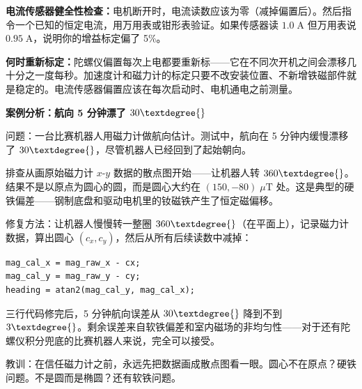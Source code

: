 \textbf{电流传感器健全性检查：}电机断开时，电流读数应该为零（减掉偏置后）。然后指令一个已知的恒定电流，用万用表或钳形表验证。如果传感器读 $1.0\;\mathrm{A}$ 但万用表说 $0.95\;\mathrm{A}$，说明你的增益标定偏了 5\%。

\textbf{何时重新标定：}陀螺仪偏置每次上电都要重新标——它在不同次开机之间会漂移几十分之一度每秒。加速度计和磁力计的标定只要不改安装位置、不新增铁磁部件就是稳定的。电流传感器偏置应该在每次启动时、电机通电之前测量。


\vspace{0.5em}
\begin{mdframed}[linewidth=1pt, innertopmargin=10pt, innerbottommargin=10pt]
\textbf{案例分析：航向 5 分钟漂了 $30\textdegree{}$}

\vspace{0.3em}
问题：一台比赛机器人用磁力计做航向估计。测试中，航向在 5 分钟内缓慢漂移了 $30\textdegree{}$，尽管机器人已经回到了起始朝向。

排查从画原始磁力计 $x$-$y$ 数据的散点图开始——让机器人转 $360\textdegree{}$。结果不是以原点为圆心的圆，而是圆心大约在 $(150, -80)\;\mu\mathrm{T}$ 处。这是典型的硬铁偏差——钢制底盘和驱动电机里的钕磁铁产生了恒定磁偏移。

修复方法：让机器人慢慢转一整圈 $360\textdegree{}$（在平面上），记录磁力计数据，算出圆心 $(c_x, c_y)$，然后从所有后续读数中减掉：

\begin{verbatim}
mag_cal_x = mag_raw_x - cx;
mag_cal_y = mag_raw_y - cy;
heading = atan2(mag_cal_y, mag_cal_x);
\end{verbatim}

三行代码修完后，5 分钟航向误差从 $30\textdegree{}$ 降到不到 $3\textdegree{}$。剩余误差来自软铁偏差和室内磁场的非均匀性——对于还有陀螺仪积分兜底的比赛机器人来说，完全可以接受。

教训：在信任磁力计之前，永远先把数据画成散点图看一眼。圆心不在原点？硬铁问题。不是圆而是椭圆？还有软铁问题。
\end{mdframed}

